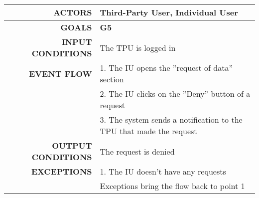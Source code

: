 \begin{table}[h!]
\begin{tabular}{|r|p{3in}|}
\hline
\textbf{ACTORS} & Third-Party User, Individual User\\
\hline
\textbf{GOALS} & \textbf{G5}\\
\hline
\textbf{INPUT CONDITIONS} & The TPU is logged in\\
\hline
\textbf{EVENT FLOW} 
&1. The IU opens the ''request of data'' section \\
&2. The IU clicks on the ''Deny'' button of a request \\
&3. The system sends a notification to the TPU that made the request \\
\hline
\textbf{OUTPUT CONDITIONS} & The request is denied\\
\hline
\textbf{EXCEPTIONS} 
&1. The IU doesn't have any requests \\
&Exceptions bring the flow back to point 1 \\
\hline
\end{tabular}
\end{table}